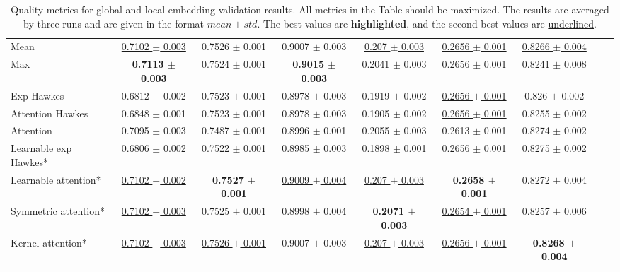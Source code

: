 \begin{table*}[!t]
\begin{tabular}{lcccccccc}
  Mean & \underline{0.7102 $\pm$ 0.003} & 0.7526 $\pm$ 0.001 & 0.9007 $\pm$ 0.003 & \underline{0.207 $\pm$ 0.003} & \underline{0.2656 $\pm$ 0.001} & \underline{0.8266 $\pm$ 0.004} \\
  Max & \textbf{0.7113 $\pm$ 0.003} & 0.7524 $\pm$ 0.001 & \textbf{0.9015 $\pm$ 0.003} & 0.2041 $\pm$ 0.003 & \underline{0.2656 $\pm$ 0.001} & 0.8241 $\pm$ 0.008 \\
  Exp Hawkes & 0.6812 $\pm$ 0.002 & 0.7523 $\pm$ 0.001 & 0.8978 $\pm$ 0.003 & 0.1919 $\pm$ 0.002 & \underline{0.2656 $\pm$ 0.001} & 0.826 $\pm$ 0.002 \\
  Attention Hawkes & 0.6848 $\pm$ 0.001 & 0.7523 $\pm$ 0.001 & 0.8978 $\pm$ 0.003 & 0.1905 $\pm$ 0.002 & \underline{0.2656 $\pm$ 0.001} & 0.8255 $\pm$ 0.002 \\
  Attention & 0.7095 $\pm$ 0.003 & 0.7487 $\pm$ 0.001 & 0.8996 $\pm$ 0.001 & 0.2055 $\pm$ 0.003 & 0.2613 $\pm$ 0.001 & 0.8274 $\pm$ 0.002 \\
  Learnable exp Hawkes* & 0.6806 $\pm$ 0.002 & 0.7522 $\pm$ 0.001 & 0.8985 $\pm$ 0.003 & 0.1898 $\pm$ 0.001 & \underline{0.2656 $\pm$ 0.001} & 0.8275 $\pm$ 0.002 \\
  Learnable attention* & \underline{0.7102 $\pm$ 0.002} & \textbf{0.7527 $\pm$ 0.001} & \underline{0.9009 $\pm$ 0.004} & \underline{0.207 $\pm$ 0.003} & \textbf{0.2658 $\pm$ 0.001} & 0.8272 $\pm$ 0.004 \\
  Symmetric attention* & \underline{0.7102 $\pm$ 0.003} & 0.7525 $\pm$ 0.001 & 0.8998 $\pm$ 0.004 & \textbf{0.2071 $\pm$ 0.003} & \underline{0.2654 $\pm$ 0.001} & 0.8257 $\pm$ 0.006 \\
  Kernel attention* & \underline{0.7102 $\pm$ 0.003} & \underline{0.7526 $\pm$ 0.001} & 0.9007 $\pm$ 0.003 & \underline{0.207 $\pm$ 0.003} & \underline{0.2656 $\pm$ 0.001} & \textbf{0.8268 $\pm$ 0.004} \\
\bottomrule
\end{tabular}
\caption{\selectfont Quality metrics for global and local embedding validation results. 
All metrics in the Table should be maximized. 
The results are averaged by three runs and are given in the format $mean \pm std$. 
The best values are \textbf{highlighted}, and the second-best values are \underline{underlined}.}
\label{tab:metrics}
\end{table*}


